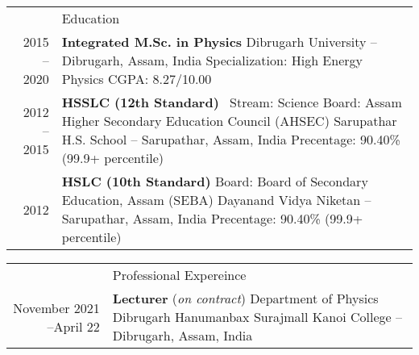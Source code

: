 \documentclass[a4paper, 11pt]{article}
\newcommand{\headingfont}{\Large\color{Peach}}
\newenvironment{SectionTable}[1]{
	\renewcommand*{\arraystretch}{1.7}
	\setlength{\tabcolsep}{10pt}
	\begin{longtable}{Rp{5.2in}} & #1 \\}
{\end{longtable}\vspace{-.3cm}}
\begin{document}
\begin{SectionTable}{\headingfont Education}

2015 -- 2020 & 
\textbf{Integrated M.Sc. in Physics} \newline
Dibrugarh University -- Dibrugarh, Assam, India \newline 
Specialization: High Energy Physics \newline
CGPA: 8.27/10.00 \\


2012 -- 2015 & 
\textbf{HSSLC (12th Standard)} \ Stream: Science \newline
Board: Assam Higher Secondary Education Council (AHSEC) \newline 
Sarupathar H.S. School -- Sarupathar, Assam, India \newline
Precentage: 90.40\% (99.9+ percentile) \\

2012 &
\textbf{HSLC (10th Standard)} \newline
Board: Board of Secondary Education, Assam (SEBA) \newline 
Dayanand Vidya Niketan -- Sarupathar, Assam, India \newline
Precentage: 90.40\% (99.9+ percentile) \\


\end{SectionTable}







\begin{SectionTable}{\headingfont Professional Expereince}

November 2021 --April 22 & 
\textbf{Lecturer} (\textit{on contract}) \newline
Department of Physics\newline
Dibrugarh Hanumanbax Surajmall Kanoi College -- Dibrugarh, Assam, India  \\
\end{SectionTable}
\end{document}
